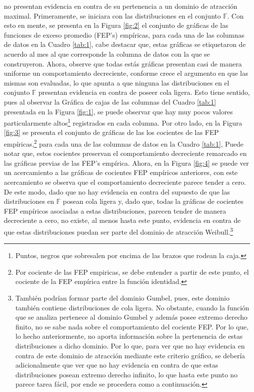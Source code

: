 \documentclass[10.5pt,notitlepage]{article}
\newcommand{\FF}{\mathbb{F}}
\theoremstyle{plain}
\begin{document}
no presentan evidencia en contra de su pertenencia a un dominio de atracción maximal. Primeramente, se iniciara con las distribuciones en el conjunto \(\mathbb{F}\). Con esto en mente, se presenta en la Figura \ref{fig:2} el conjunto de gráficas de las funciones de exceso promedio (FEP's) empíricas, para cada una de las columnas de datos en la Cuadro \ref{tab:1}, cabe destacar que, estas gráficas se etiquetaron de acuerdo al mes al que corresponde la columna de datos con la que se construyeron. Ahora, observe que todas estás gráficas presentan casi de manera uniforme un comportamiento decreciente, conforme crece el argumento en que las mismas son evaluadas, lo que apunta a que ninguna las distribuciones en el conjunto \(\FF\) presentan evidencia en contra de poseer cola ligera. Esto tiene sentido, pues al observar la Gráfica de cajas de las columnas del Cuadro \ref{tab:1} presentada en la Figura \ref{fig:1}, se puede observar que hay muy pocos valores particularmente altos\footnote{Puntos, negros que sobresalen por encima de las brazos que rodean la caja.} registrados en cada columna. Por otro lado, en la Figura \ref{fig:3} se presenta el conjunto de gráficas de las los cocientes de las FEP empíricas,\footnote{Por cociente de las FEP empiricas, se debe entender a partir de este punto, el cociente de la FEP empírica entre la función identidad.} para cada una de las columnas de datos en la Cuadro \ref{tab:1}, Puede notar que, estos cocientes preservan el comportamiento decreciente remarcado en las gráficas previas de las FEP's empírica. Ahora, en la Figura \ref{fig:4} se puede ver un acercamiento a las gráficas de cocientes FEP empíricos anteriores, con este acercamiento se observa que el comportamiento decreciente parece tender a cero. De este modo, dado que no hay evidencia en contra del supuesto de que las distribuciones en \(\FF\) posean cola ligera y, dado que, todas la gráficas de cocientes FEP empíricos asociadas a estas distribuciones, parecen tender de manera decreciente a cero, no existe, al menos hasta este punto, evidencia en contra de que estas distribuciones puedan ser parte del dominio de atracción Weibull.\footnote{También podrían formar parte del dominio Gumbel, pues, este dominio también contiene distribuciones de cola ligera. No obstante, cuando la función que se analiza pertenece al dominio Gumbel y además posee extremo derecho finito, no se sabe nada sobre el comportamiento del cociente FEP. Por lo que, lo hecho anteriormente, no aporta información sobre la pertenencia de estas distribuciones a dicho dominio. Por lo que, para ver que no hay evidencia en contra de este dominio de atracción mediante este criterio gráfico, se debería adicionalmente que ver que no hay evidencia en contra de que estas distribuciones posean extremo derecho infinito, lo que hasta este punto no parece tarea fácil, por ende se procedera como a continuación. }
\end{document}
